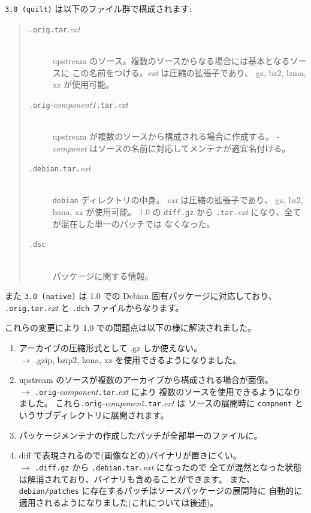 \documentclass[mingoth,a4paper]{jsarticle}
\begin{document}
{\tt 3.0 (quilt)} は以下のファイル群で構成されます:
\begin{quote}
    \begin{screen}
        \begin{description}
              \item[{\tt .orig.tar}.{\it ext}] 　\\
            upstream のソース。複数のソースからなる場合には基本となるソースに
            この名前をつける。{\it ext} は圧縮の拡張子であり、
            gz, bz2, lzma, xz が使用可能。
              \item[{\tt .orig}{\it -component1}{\tt .tar.}{\it ext}]　\\
            upstream が複数のソースから構成される場合に作成する。
            {\it -componet} はソースの名前に対応してメンテナが適宜名付ける。
              \item[{\tt .debian.tar.}{\it ext}]　\\
            {\tt debian} ディレクトリの中身。
            {\it ext} は圧縮の拡張子であり、
            gz, bz2, lzma, xz が使用可能。
            1.0 の {\tt diff.gz} から
            {\tt .tar.}{\it ext} になり、全てが混在した単一のパッチでは
            なくなった。
              \item[{\tt .dsc}] 　\\
          パッケージに関する情報。
        \end{description}
    \end{screen}
\end{quote}
また {\tt 3.0 (native)} は 1.0 での Debian 固有パッケージに対応しており、
{\tt .orig.tar.}{\it ext} と {\tt .dch} ファイルからなります。

%
これらの変更により 1.0 での問題点は以下の様に解決されました。
\begin{enumerate}
      \item アーカイブの圧縮形式として .gz しか使えない。\\
    $\to$ .gzip, bzip2, lzma, xz を使用できるようになりました。
      \item upstream のソースが複数のアーカイブから構成される場合が面倒。\\
    $\to$ {\tt .orig}{\it -component}{\tt .tar}{\it .ext} により
    複数のソースを使用できるようになりました。
    これら{\tt .orig}{\it -component}{\tt .tar}{\it .ext} は
    ソースの展開時に {\tt compnent} というサブディレクトリに展開されます。
      \item パッケージメンテナの作成したパッチが全部単一のファイルに。
      \item diff で表現されるので(画像などの)バイナリが置きにくい。\\
    $\to$ {\tt .diff.gz} から {\tt .debian.tar.}{\it ext} になったので
    全てが混然となった状態は解消されており、バイナリも含めることができます。
    また、 {\tt debian/patches} に存在するパッチはソースパッケージの展開時に
    自動的に適用されるようになりました(これについては後述)。
\end{enumerate}
\end{document}
